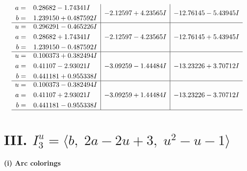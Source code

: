 \documentclass[1p]{elsarticle_modified}
\theoremstyle{definition}
\begin{document}
$$\begin{array}{c|c|c}
\begin{aligned}
a &= \phantom{-}0.28682 - 1.74341 I \\
b &= \phantom{-}1.239150 + 0.487592 I\end{aligned}
 & -2.12597 + 4.23565 I & -12.76145 - 5.43945 I \\ \hline\begin{aligned}
u &= \phantom{-}0.296291 - 0.465226 I \\
a &= \phantom{-}0.28682 + 1.74341 I \\
b &= \phantom{-}1.239150 - 0.487592 I\end{aligned}
 & -2.12597 - 4.23565 I & -12.76145 + 5.43945 I \\ \hline\begin{aligned}
u &= \phantom{-}0.100373 + 0.382494 I \\
a &= \phantom{-}0.41107 - 2.93021 I \\
b &= \phantom{-}0.441181 + 0.955338 I\end{aligned}
 & -3.09259 - 1.44484 I & -13.23226 + 3.70712 I \\ \hline\begin{aligned}
u &= \phantom{-}0.100373 - 0.382494 I \\
a &= \phantom{-}0.41107 + 2.93021 I \\
b &= \phantom{-}0.441181 - 0.955338 I\end{aligned}
 & -3.09259 + 1.44484 I & -13.23226 - 3.70712 I\\
 \hline 
 \end{array}$$\newpage\newpage\renewcommand{\arraystretch}{1}
\centering \section*{III. $I^u_{3}= \langle b,\;2 a-2 u+3,\;u^2- u-1 \rangle$}
\flushleft \textbf{(i) Arc colorings}\\
\end{document}
